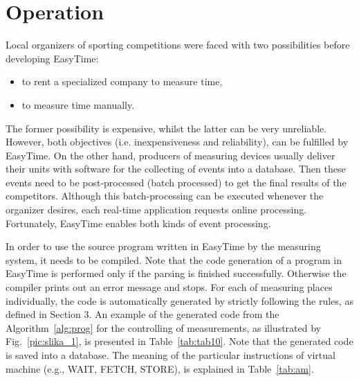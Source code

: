 \documentclass[preprint, prX]{revtex4}
\begin{document}
\section{Operation}

Local organizers of sporting competitions were faced with two possibilities before developing EasyTime:
\begin{itemize}
  \item to rent a specialized company to measure time,
  \item to measure time manually.
\end{itemize}
The former possibility is expensive, whilst the latter can be very unreliable. However, both objectives (i.e. inexpensiveness and reliability), can be fulfilled by EasyTime. On the other hand, producers of measuring devices usually deliver their units with software for the collecting of events into a database. Then these events need to be post-processed (batch processed) to get the final results of the competitors. Although this batch-processing can be executed whenever the organizer desires, each real-time application requests online processing. Fortunately, EasyTime enables both kinds of event processing.

In order to use the source program written in EasyTime by the measuring system, it needs to be compiled. Note that the code
generation \cite{Aho:1972} of a program in EasyTime is performed only if the parsing is finished successfully. Otherwise the compiler
prints out an error message and stops. For each of measuring places individually, the code is automatically generated by strictly following the rules, as defined in Section 3. An example of the generated code from the Algorithm~\ref{alg:prog} for the controlling of measurements, as illustrated by Fig.~\ref{pic:slika_1}, is presented in Table~\ref{tab:tab10}. Note that the generated code is saved
into a database. The meaning of the particular instructions of virtual machine (e.g., WAIT, FETCH, STORE), is explained in Table~\ref{tab:am}.
\end{document}
